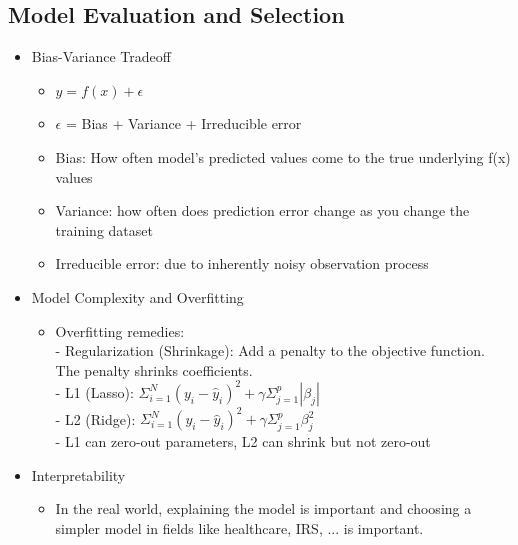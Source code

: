 \documentclass{article}
\begin{document}
\begin{multicols*}{3}
        \section{Model Evaluation and Selection}
    \renewcommand\labelitemi{{\boldmath$\cdot$}}
    \begin{itemize}[noitemsep]
        \item Bias-Variance Tradeoff
        \begin{itemize}
            \item $y = f(x) + \epsilon$
            \item $\epsilon$ = Bias + Variance + Irreducible error
            \item Bias: How often model's predicted values come to 
            the true underlying f(x) values
            \item Variance: how often does prediction error change as 
            you change the training dataset
            \item Irreducible error: due to inherently noisy observation process
        \end{itemize}
        \item Model Complexity and Overfitting
        \begin{itemize}
            \item Overfitting remedies: \\
            - Regularization (Shrinkage): Add a penalty to the objective function.
            The penalty shrinks coefficients. \\
            - L1 (Lasso): $\Sigma_{i=1}^N (y_i - \hat{y}_i)^2 + \gamma\Sigma_{j=1}^p|\beta_j|$ \\
            - L2 (Ridge): $\Sigma_{i=1}^N (y_i - \hat{y}_i)^2 + \gamma\Sigma_{j=1}^p\beta_j^2$ \\
            - L1 can zero-out parameters, L2 can shrink but not zero-out
        \end{itemize}
        \item Interpretability
        \begin{itemize}
            \item In the real world, explaining the model is important 
            and choosing a simpler model in fields like healthcare, 
            IRS, ... is important.
        \end{itemize}
    \end{itemize}


\end{multicols*}
\end{document}
